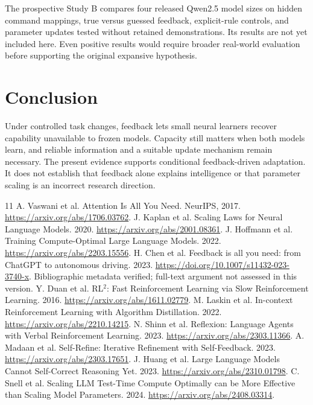 \documentclass[11pt]{article}
\begin{document}
The prospective Study B compares four released Qwen2.5 model sizes on hidden
command mappings, true versus guessed feedback, explicit-rule controls, and
parameter updates tested without retained demonstrations. Its results are
not yet included here. Even positive results would require broader real-world
evaluation before supporting the original expansive hypothesis.

\section{Conclusion}
Under controlled task changes, feedback lets small neural learners recover
capability unavailable to frozen models. Capacity still matters when both
models learn, and reliable information and a suitable update mechanism remain
necessary. The present evidence supports conditional feedback-driven
adaptation. It does not establish that feedback alone explains intelligence
or that parameter scaling is an incorrect research direction.

\begin{thebibliography}{11}
 A. Vaswani et al. Attention Is All You Need. NeurIPS, 2017.
\url{https://arxiv.org/abs/1706.03762}.
 J. Kaplan et al. Scaling Laws for Neural Language Models. 2020.
\url{https://arxiv.org/abs/2001.08361}.
 J. Hoffmann et al. Training Compute-Optimal Large Language Models. 2022.
\url{https://arxiv.org/abs/2203.15556}.
 H. Chen et al. Feedback is all you need: from ChatGPT to autonomous driving. 2023.
\url{https://doi.org/10.1007/s11432-023-3740-x}. Bibliographic metadata verified;
full-text argument not assessed in this version.
 Y. Duan et al. RL$^2$: Fast Reinforcement Learning via Slow Reinforcement Learning. 2016.
\url{https://arxiv.org/abs/1611.02779}.
 M. Laskin et al. In-context Reinforcement Learning with Algorithm Distillation. 2022.
\url{https://arxiv.org/abs/2210.14215}.
 N. Shinn et al. Reflexion: Language Agents with Verbal Reinforcement Learning. 2023.
\url{https://arxiv.org/abs/2303.11366}.
 A. Madaan et al. Self-Refine: Iterative Refinement with Self-Feedback. 2023.
\url{https://arxiv.org/abs/2303.17651}.
 J. Huang et al. Large Language Models Cannot Self-Correct Reasoning Yet. 2023.
\url{https://arxiv.org/abs/2310.01798}.
 C. Snell et al. Scaling LLM Test-Time Compute Optimally can be More Effective than Scaling Model Parameters. 2024.
\url{https://arxiv.org/abs/2408.03314}.
\end{thebibliography}
\end{document}
